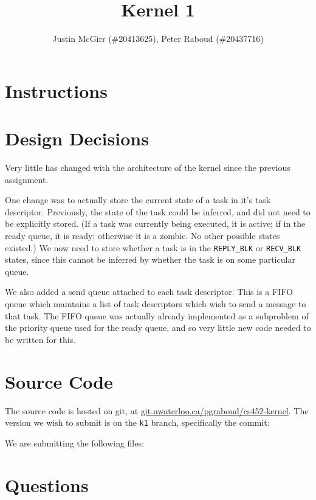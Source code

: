 \documentclass[titlepage]{article}
\begin{document}
\title{Kernel 1}
\author{Justin McGirr (\#20413625), Peter Raboud (\#20437716)}
\maketitle

\section{Instructions}


\section{Design Decisions}
Very little has changed with the architecture of the kernel since the previous assignment.

One change was to actually store the current state of a task in it's task descriptor.
Previously, the state of the task could be inferred, and did not need to be explicitly stored.
(If a task was currently being executed, it is active; if in the ready queue, it is ready; otherwise
it is a zombie. No other possible states existed.)
We now need to store whether a task is in the \texttt{REPLY\_BLK} or \texttt{RECV\_BLK} states,
since this cannot be inferred by whether the task is on some particular queue.

We also added a send queue attached to each task descriptor.
This is a FIFO queue which maintains a list of task descriptors which wish to send a message
to that task.
The FIFO queue was actually already implemented as a subproblem of the priority queue used
for the ready queue, and so very little new code needed to be written for this.

\section{Source Code}
The source code is hosted on git, at \url{git.uwaterloo.ca/pgraboud/cs452-kernel}.
The version we wish to submit is on the \texttt{k1} branch, specifically
the commit:

We are submitting the following files:


\section{Questions}
\end{document}
